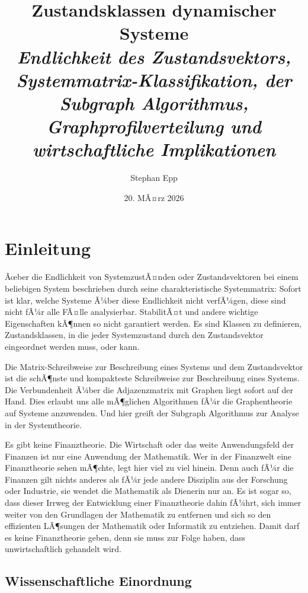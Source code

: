 ﻿\documentclass[12pt, a4paper, titlepage]{report}
\title{\textbf{Zustandsklassen dynamischer Systeme}\\
  {\Large\itshape Endlichkeit des Zustandsvektors, Systemmatrix-Klassifikation,
   der Subgraph Algorithmus, Graphprofilverteilung und wirtschaftliche Implikationen}}
\author{Stephan Epp}
\date{20. MÃ¤rz 2026}
\theoremstyle{definition}
\theoremstyle{remark}
\begin{document}

\maketitle
\tableofcontents
\newpage

\chapter{Einleitung}

Ãœber die Endlichkeit von SystemzustÃ¤nden oder Zustandsvektoren bei einem beliebigen
System beschrieben durch seine charakteristische Systemmatrix: Sofort ist klar, welche Systeme
Ã¼ber diese Endlichkeit nicht verfÃ¼gen, diese sind nicht fÃ¼r alle FÃ¤lle analysierbar. StabilitÃ¤t
und andere wichtige Eigenschaften kÃ¶nnen so nicht garantiert werden. Es sind Klassen zu
definieren, Zustandsklassen, in die jeder Systemzustand durch den Zustandsvektor
eingeordnet werden muss, oder kann.

Die Matrix-Schreibweise zur Beschreibung eines Systems und dem Zustandsvektor ist die
schÃ¶nste und kompakteste Schreibweise zur Beschreibung eines Systems. Die Verbundenheit
Ã¼ber die Adjazenzmatrix mit Graphen liegt sofort auf der Hand. Dies erlaubt uns alle
mÃ¶glichen Algorithmen fÃ¼r die Graphentheorie auf Systeme anzuwenden. Und hier greift der
Subgraph Algorithmus zur Analyse in der Systemtheorie.

Es gibt keine Finanztheorie. Die Wirtschaft oder das weite Anwendungsfeld der Finanzen
ist nur eine Anwendung der Mathematik. Wer in der Finanzwelt eine Finanztheorie sehen
mÃ¶chte, legt hier viel zu viel hinein. Denn auch fÃ¼r die Finanzen gilt nichts anderes
als fÃ¼r jede andere Disziplin aus der Forschung oder Industrie, sie wendet
die Mathematik als Dienerin nur an. Es ist sogar so, dass dieser Irrweg der Entwicklung
einer Finanztheorie dahin fÃ¼hrt, sich immer weiter von den Grundlagen der Mathematik zu
entfernen und sich so den effizienten LÃ¶sungen der Mathematik oder Informatik zu
entziehen. Damit darf es keine Finanztheorie geben, denn sie muss zur Folge haben, dass
unwirtschaftlich gehandelt wird.

\section{Wissenschaftliche Einordnung}
\end{document}
